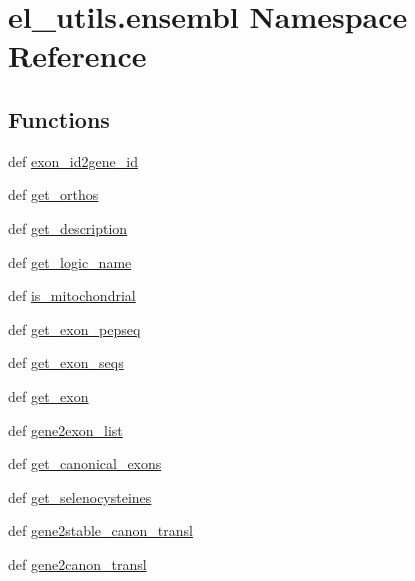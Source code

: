 \hypertarget{namespaceel__utils_1_1ensembl}{\section{el\-\_\-utils.\-ensembl Namespace Reference}
\label{namespaceel__utils_1_1ensembl}
}
\subsection*{Functions}
\begin{DoxyCompactItemize}
\item 
def \hyperlink{namespaceel__utils_1_1ensembl_a4ce85fcceb23615333f7d3bf9aa66be6}{exon\-\_\-id2gene\-\_\-id}
\item 
def \hyperlink{namespaceel__utils_1_1ensembl_a7d722b6165c3ea9d7794607edd57e302}{get\-\_\-orthos}
\item 
def \hyperlink{namespaceel__utils_1_1ensembl_a1824e701d17b97129de2849ec3eddddb}{get\-\_\-description}
\item 
def \hyperlink{namespaceel__utils_1_1ensembl_ab77ec7af8499b44c6c951016abeb357e}{get\-\_\-logic\-\_\-name}
\item 
def \hyperlink{namespaceel__utils_1_1ensembl_a49c06fccb9f5d574262bbea42704fb6a}{is\-\_\-mitochondrial}
\item 
def \hyperlink{namespaceel__utils_1_1ensembl_a7209a32d240721b5cce913d005241621}{get\-\_\-exon\-\_\-pepseq}
\item 
def \hyperlink{namespaceel__utils_1_1ensembl_a4e9f799e6eef1b113965e942487dcc67}{get\-\_\-exon\-\_\-seqs}
\item 
def \hyperlink{namespaceel__utils_1_1ensembl_a4d6de37a0ad76b8c0fcbd9e3c9856d5e}{get\-\_\-exon}
\item 
def \hyperlink{namespaceel__utils_1_1ensembl_a4a00b508d239ee53e98ec401e0cc54ee}{gene2exon\-\_\-list}
\item 
def \hyperlink{namespaceel__utils_1_1ensembl_a0d3d4fa7d2512178702285624215b2d1}{get\-\_\-canonical\-\_\-exons}
\item 
def \hyperlink{namespaceel__utils_1_1ensembl_a462145b70350353b526cb6b7447bdcb9}{get\-\_\-selenocysteines}
\item 
def \hyperlink{namespaceel__utils_1_1ensembl_afb23a4208db883709599aad25266427c}{gene2stable\-\_\-canon\-\_\-transl}
\item 
def \hyperlink{namespaceel__utils_1_1ensembl_a513044f84d0d1d551a674d93e093eabc}{gene2canon\-\_\-transl}
\item 

\end{DoxyCompactItemize}
